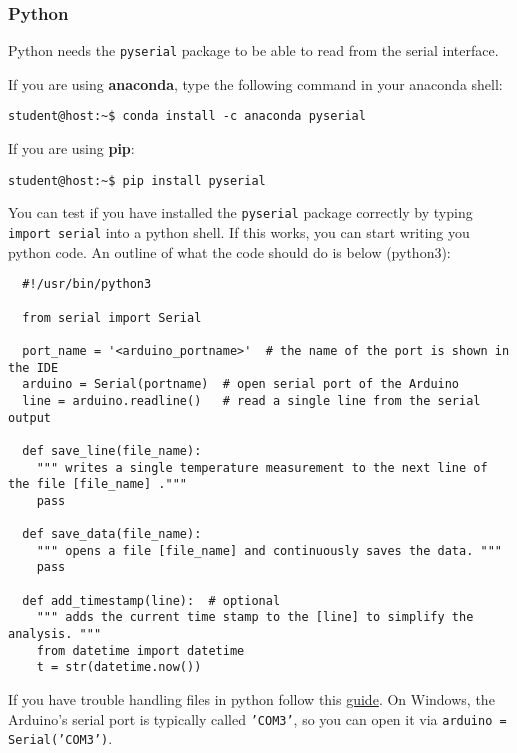 \subsubsection{Python}
Python needs the \texttt{pyserial} package to be able to read from the serial interface.\par
%
\noindent If you are using \textbf{anaconda}, type the following command in your anaconda shell:
%
\begin{verbatim}
student@host:~$ conda install -c anaconda pyserial
\end{verbatim}
%
\noindent If you are using \textbf{pip}:
\begin{verbatim}
student@host:~$ pip install pyserial
\end{verbatim}
%
You can test if you have installed the \texttt{pyserial} package correctly by typing \texttt{import serial} into a python shell. If this works, you can start writing you python code. An outline of what the code should do is below (python3):
%
\mdfsetblack
\begin{verbatim}
  #!/usr/bin/python3
  
  from serial import Serial
  
  port_name = '<arduino_portname>'  # the name of the port is shown in the IDE
  arduino = Serial(portname)  # open serial port of the Arduino
  line = arduino.readline()   # read a single line from the serial output
  
  def save_line(file_name):  
    """ writes a single temperature measurement to the next line of the file [file_name] ."""
    pass
    
  def save_data(file_name):
    """ opens a file [file_name] and continuously saves the data. """
    pass
    
  def add_timestamp(line):  # optional
    """ adds the current time stamp to the [line] to simplify the analysis. """
    from datetime import datetime
    t = str(datetime.now())
\end{verbatim}
%
If you have trouble handling files in python follow this \href{http://www.pythonforbeginners.com/files/reading-and-writing-files-in-python}{guide}. On Windows, the Arduino's serial port is typically called \texttt{'COM3'}, so you can open it via \texttt{arduino = Serial('COM3')}.
%

